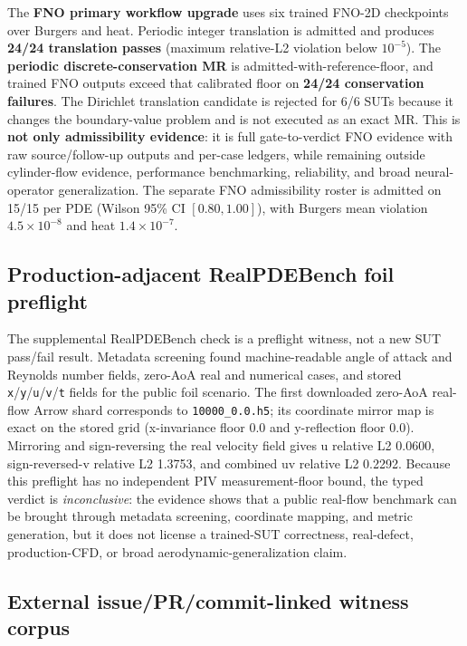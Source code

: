 The \textbf{FNO primary workflow upgrade} uses six trained FNO-2D checkpoints over Burgers and heat. Periodic integer translation is admitted and produces \textbf{24/24 translation passes} (maximum relative-L2 violation below $10^{-5}$). The \textbf{periodic discrete-conservation MR} is admitted-with-reference-floor, and trained FNO outputs exceed that calibrated floor on \textbf{24/24 conservation failures}. The Dirichlet translation candidate is rejected for 6/6 SUTs because it changes the boundary-value problem and is not executed as an exact MR. This is \textbf{not only admissibility evidence}: it is full gate-to-verdict FNO evidence with raw source/follow-up outputs and per-case ledgers, while remaining outside cylinder-flow evidence, performance benchmarking, reliability, and broad neural-operator generalization. The separate FNO admissibility roster is admitted on 15/15 per PDE (Wilson 95\% CI $[0.80, 1.00]$), with Burgers mean violation $4.5\times10^{-8}$ and heat $1.4\times10^{-7}$.

\subsection{Production-adjacent RealPDEBench foil preflight}
\label{subsec:realpdebench-foil-preflight}

The supplemental RealPDEBench check is a preflight witness, not a new SUT
pass/fail result. Metadata screening found machine-readable angle of attack and
Reynolds number fields, zero-AoA real and numerical cases, and stored
\texttt{x}/\texttt{y}/\texttt{u}/\texttt{v}/\texttt{t} fields for the public
foil scenario. The first downloaded zero-AoA real-flow Arrow shard corresponds
to \texttt{10000\_0.0.h5}; its coordinate mirror map is exact on the stored grid
(x-invariance floor 0.0 and y-reflection floor 0.0). Mirroring and
sign-reversing the real velocity field gives u relative L2 0.0600,
sign-reversed-v relative L2 1.3753, and combined uv relative L2 0.2292. Because
this preflight has no independent PIV measurement-floor bound, the typed verdict
is \emph{inconclusive}: the evidence shows that a public real-flow benchmark can
be brought through metadata screening, coordinate mapping, and metric generation,
but it does not license a trained-SUT correctness, real-defect, production-CFD,
or broad aerodynamic-generalization claim.

\subsection{External issue/PR/commit-linked witness corpus}
\label{subsec:external-defect-witness-corpus}


